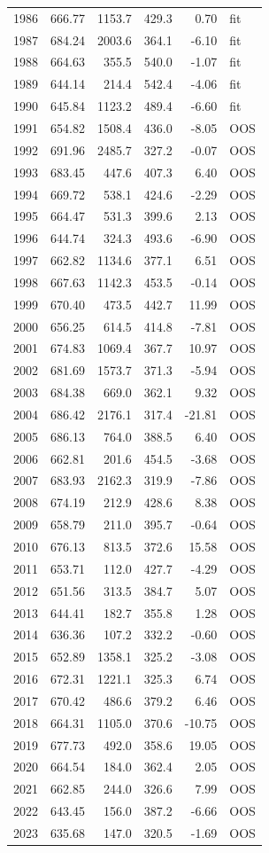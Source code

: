 \documentclass[11pt,a4paper]{article}
\begin{document}
\begin{longtable}{rrrrrl}
1986 & 666.77 & 1153.7 & 429.3 & 0.70 & fit \\
1987 & 684.24 & 2003.6 & 364.1 & -6.10 & fit \\
1988 & 664.63 & 355.5 & 540.0 & -1.07 & fit \\
1989 & 644.14 & 214.4 & 542.4 & -4.06 & fit \\
1990 & 645.84 & 1123.2 & 489.4 & -6.60 & fit \\
1991 & 654.82 & 1508.4 & 436.0 & -8.05 & OOS \\
1992 & 691.96 & 2485.7 & 327.2 & -0.07 & OOS \\
1993 & 683.45 & 447.6 & 407.3 & 6.40 & OOS \\
1994 & 669.72 & 538.1 & 424.6 & -2.29 & OOS \\
1995 & 664.47 & 531.3 & 399.6 & 2.13 & OOS \\
1996 & 644.74 & 324.3 & 493.6 & -6.90 & OOS \\
1997 & 662.82 & 1134.6 & 377.1 & 6.51 & OOS \\
1998 & 667.63 & 1142.3 & 453.5 & -0.14 & OOS \\
1999 & 670.40 & 473.5 & 442.7 & 11.99 & OOS \\
2000 & 656.25 & 614.5 & 414.8 & -7.81 & OOS \\
2001 & 674.83 & 1069.4 & 367.7 & 10.97 & OOS \\
2002 & 681.69 & 1573.7 & 371.3 & -5.94 & OOS \\
2003 & 684.38 & 669.0 & 362.1 & 9.32 & OOS \\
2004 & 686.42 & 2176.1 & 317.4 & -21.81 & OOS \\
2005 & 686.13 & 764.0 & 388.5 & 6.40 & OOS \\
2006 & 662.81 & 201.6 & 454.5 & -3.68 & OOS \\
2007 & 683.93 & 2162.3 & 319.9 & -7.86 & OOS \\
2008 & 674.19 & 212.9 & 428.6 & 8.38 & OOS \\
2009 & 658.79 & 211.0 & 395.7 & -0.64 & OOS \\
2010 & 676.13 & 813.5 & 372.6 & 15.58 & OOS \\
2011 & 653.71 & 112.0 & 427.7 & -4.29 & OOS \\
2012 & 651.56 & 313.5 & 384.7 & 5.07 & OOS \\
2013 & 644.41 & 182.7 & 355.8 & 1.28 & OOS \\
2014 & 636.36 & 107.2 & 332.2 & -0.60 & OOS \\
2015 & 652.89 & 1358.1 & 325.2 & -3.08 & OOS \\
2016 & 672.31 & 1221.1 & 325.3 & 6.74 & OOS \\
2017 & 670.42 & 486.6 & 379.2 & 6.46 & OOS \\
2018 & 664.31 & 1105.0 & 370.6 & -10.75 & OOS \\
2019 & 677.73 & 492.0 & 358.6 & 19.05 & OOS \\
2020 & 664.54 & 184.0 & 362.4 & 2.05 & OOS \\
2021 & 662.85 & 244.0 & 326.6 & 7.99 & OOS \\
2022 & 643.45 & 156.0 & 387.2 & -6.66 & OOS \\
2023 & 635.68 & 147.0 & 320.5 & -1.69 & OOS \\
\end{longtable}
\end{document}
